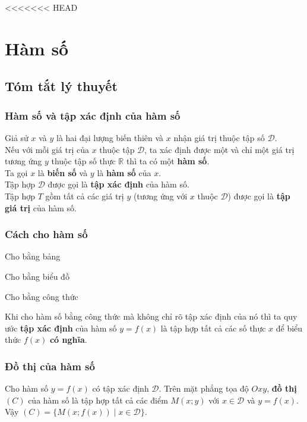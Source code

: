 <<<<<<< HEAD
\setcounter{section}{0}
\section{Hàm số}

\subsection{Tóm tắt lý thuyết}
\subsubsection{Hàm số và tập xác định của hàm số}
\begin{dn}{}
	Giả sử $x$ và $y$ là hai đại lượng biến thiên và $x$ nhận giá trị thuộc tập số $\mathscr{D}$.\\
	Nếu với mỗi giá trị của $x$ thuộc tập $\mathscr{D}$, ta xác định được một và chỉ một giá trị tương ứng $y$ thuộc tập số thực $\mathbb{R}$ thì ta có một \textbf{hàm số}. \\
	Ta gọi $x$ là \textbf{biến số} và $y$ là \textbf{hàm số} của $x$.\\
	Tập hợp $\mathscr{D}$ được gọi là \textbf{tập xác định} của hàm số.\\
	Tập hợp $T$ gồm tất cả các giá trị $y$ (tương ứng với $x$ thuộc $\mathscr{D}$) được gọi là \textbf{tập giá trị} của hàm số.
\end{dn}

\subsubsection{Cách cho hàm số}

\begin{listEX}[3]
	\item Cho bằng bảng
	\item Cho bằng biểu đồ
	\item Cho bằng công thức
\end{listEX}

\begin{note}
	Khi cho hàm số bằng công thức mà không chỉ rõ tập xác định của nó thì ta quy ước \textbf{tập xác định} của hàm số $y=f(x)$ là tập hợp tất cả các số thực $x$ để biểu thức $f(x)$ \textbf{có nghĩa}.
\end{note}

\subsubsection{Đồ thị của hàm số}
\begin{dn}{}
	Cho hàm số $y=f(x)$ có tập xác định $\mathscr{D}$. Trên mặt phẳng tọa độ $Oxy$, \textbf{đồ thị} $(C)$ của hàm số là tập hợp tất cả các điểm $M(x;y)$ với $x\in\mathscr{D}$ và $y=f(x)$.\\
	Vậy $(C)=\{M(x;f(x))\mid x\in\mathscr{D}\}$.
\end{dn}

